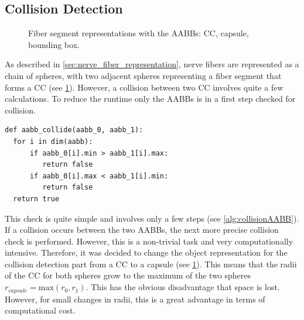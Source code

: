 \subsection{Collision Detection}
\label{sec:collisionDetection}
%
\begin{figure}[!t]
    \centering
    \setlength{\tikzwidth}{0.6\textwidth}
    \tikzset{external/export=false}
	\caption[]{Fiber segment representations with the \acp{AABB}:  \ac{CC},  capsule,  bounding box.}
	\label{fig:conical_capsule}
\end{figure}
% 
As described in \cref{sec:nerve_fiber_representation}, nerve fibers are represented as a chain of spheres, with two adjacent spheres representing a fiber segment that forms a \ac{CC} (see \cref{fig:conical_capsule}).
However, a collision between two \ac{CC} involves quite a few calculations. To reduce the runtime only the \acp{AABB} is in a first step checked for collision.
%
\begin{lstfloat}[!tb]
\lstset{style=python}
\begin{lstlisting}[]
def aabb_collide(aabb_0, aabb_1):
  for i in dim(aabb):
      if aabb_0[i].min > aabb_1[i].max:
         return false
      if aabb_0[i].max < aabb_1[i].min:
         return false
  return true
\end{lstlisting}
\caption{Calculation if a collision between \acp{AABB} exists.}
\label{alg:collisionAABB}
\end{lstfloat}
%
This check is quite simple and involves only a few steps (see \cref{alg:collisionAABB}).
If a collision occurs between the two \acp{AABB}, the next more precise collision check is performed.
However, this is a non-trivial task and very computationally intensive.
Therefore, it was decided to change the object representation for the collision detection part from a \ac{CC} to a capsule (see \cref{fig:conical_capsule}).
This means that the radii of the \ac{CC} for both spheres grow to the maximum of the two spheres $r_{\mathit{capsule}} = \mathrm{max}(r_0, r_1)$.
This has the obvious disadvantage that space is lost. However, for small changes in radii, this is a great advantage in terms of computational cost.
\par
% 
